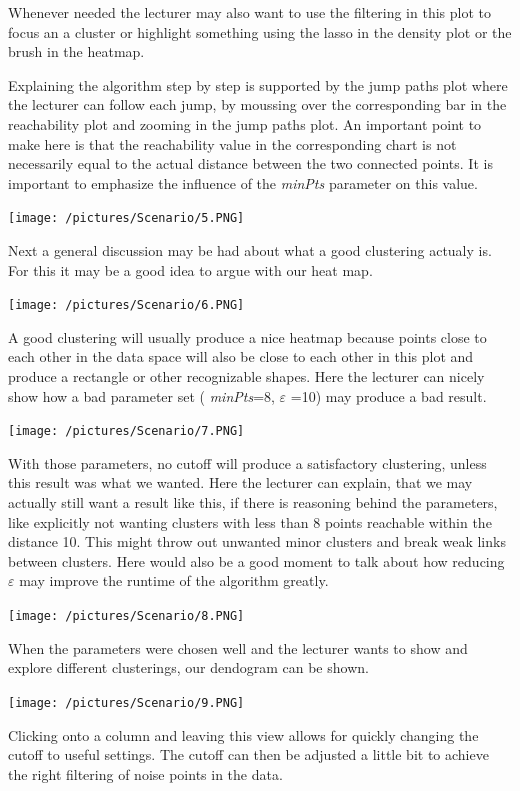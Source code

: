 \documentclass{vgtc} %
\begin{document}
Whenever needed the lecturer may also want to use the filtering in this plot to focus an a cluster or highlight something using the lasso in the density plot or the brush in the heatmap.

Explaining the algorithm step by step is supported by the jump paths plot where the lecturer can follow each jump, by moussing over the corresponding bar in the reachability plot and zooming in the jump paths plot. An important point to make here is that the reachability value in the corresponding chart is not necessarily equal to the actual distance between the two connected points. It is important to emphasize the influence of the \emph{minPts} parameter on this value.

\noindent
\texttt{[image: /pictures/Scenario/5.PNG]}

Next a general discussion may be had about what a good clustering actualy is. For this it may be a good idea to argue with our heat map.

\noindent
\texttt{[image: /pictures/Scenario/6.PNG]}

A good clustering will usually produce a nice heatmap because points close to each other in the data space will also be close to each other in this plot and produce a rectangle or other recognizable shapes. Here the lecturer can nicely show how a bad parameter set ( \emph{minPts}=8, $\varepsilon$ =10) may produce a bad result.

\noindent
\texttt{[image: /pictures/Scenario/7.PNG]}

With those parameters, no cutoff will produce a satisfactory clustering, unless this result was what we wanted. Here the lecturer can explain, that we may actually still want a result like this, if there is reasoning behind the parameters, like explicitly not wanting clusters with less than 8 points reachable within the distance 10. This might throw out unwanted minor clusters and break weak links between clusters. Here would also be a good moment to talk about how reducing $\varepsilon$ may improve the runtime of the algorithm greatly.

\noindent
\texttt{[image: /pictures/Scenario/8.PNG]}

When the parameters were chosen well and the lecturer wants to show and explore different clusterings, our dendogram can be shown.

\noindent
\texttt{[image: /pictures/Scenario/9.PNG]}

Clicking onto a column and leaving this view allows for quickly changing the cutoff to useful settings. The cutoff can then be adjusted a little bit to achieve the right filtering of noise points in the data.
\end{document}
